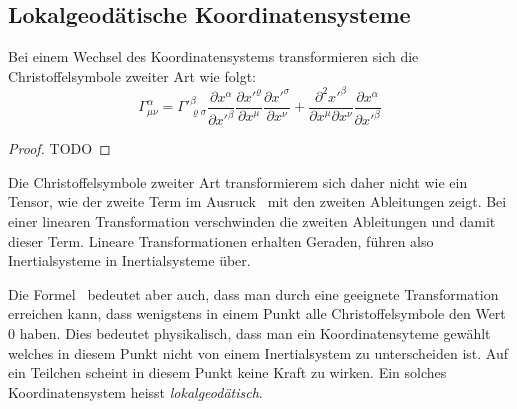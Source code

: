 \subsection{Lokalgeodätische Koordinatensysteme}
Bei einem Wechsel des Koordinatensystems transformieren sich die 
Christoffelsymbole zweiter Art wie folgt:
\begin{equation}
\Gamma^\alpha_{\mu\nu}
=
\Gamma'^\beta_{\varrho\sigma}
\frac{\partial x^\alpha}{\partial x'^\beta}
\frac{\partial x'^\varrho}{\partial x^\mu}
\frac{\partial x'^\sigma}{\partial x^\nu}
+
\frac{\partial^2 x'^\beta}{\partial x^\mu\partial x^\nu}
\frac{\partial x^\alpha}{\partial x'^\beta}
\label{skript:kruemmung:christoffeltransformation}
\end{equation}

\begin{proof}
TODO
\end{proof}

Die Christoffelsymbole zweiter Art transformierem sich daher nicht
wie ein Tensor, wie der zweite Term
im Ausruck~\label{skript:kruemmung:christoffeltransformation}
mit den zweiten Ableitungen zeigt.
Bei einer linearen Transformation verschwinden die zweiten Ableitungen
und damit dieser Term.
Lineare Transformationen erhalten Geraden, führen also Inertialsysteme
in Inertialsysteme über.

Die Formel~\label{skript:kruemmung:christoffeltransformation}
bedeutet aber auch, dass man durch eine geeignete Transformation
erreichen kann, dass wenigstens in einem Punkt alle Christoffelsymbole
den Wert $0$ haben.
Dies bedeutet physikalisch, dass man ein Koordinatensyteme gewählt welches
in diesem Punkt nicht von einem Inertialsystem zu unterscheiden ist.
Auf ein Teilchen scheint in diesem Punkt keine Kraft zu wirken.
Ein solches Koordinatensystem heisst {\em lokalgeodätisch}.

